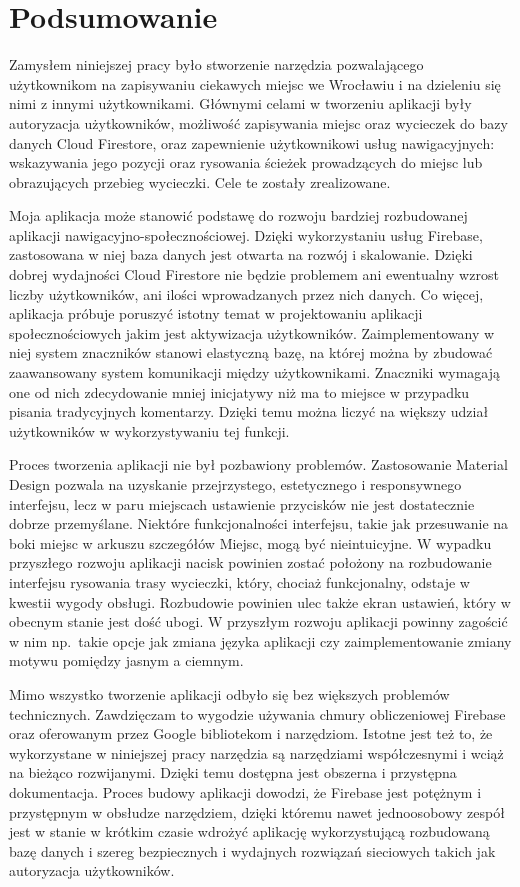 \newpage
    \section{Podsumowanie}
    Zamysłem niniejszej pracy było stworzenie narzędzia pozwalającego użytkownikom na zapisywaniu ciekawych miejsc we Wrocławiu i na dzieleniu się nimi
    z innymi użytkownikami. Głównymi celami w tworzeniu aplikacji były autoryzacja użytkowników, możliwość zapisywania miejsc oraz wycieczek do bazy danych Cloud Firestore,
    oraz zapewnienie użytkownikowi usług nawigacyjnych: wskazywania jego pozycji oraz rysowania ścieżek prowadzących do miejsc lub obrazujących przebieg wycieczki. Cele 
    te zostały zrealizowane. 

    Moja aplikacja może stanowić podstawę do rozwoju bardziej rozbudowanej aplikacji nawigacyjno-społecznościowej. Dzięki wykorzystaniu usług Firebase, zastosowana w niej baza danych jest otwarta na rozwój
    i skalowanie. Dzięki dobrej wydajności Cloud Firestore nie będzie problemem  ani ewentualny wzrost liczby użytkowników, ani ilości wprowadzanych przez nich danych.
    Co więcej, aplikacja próbuje poruszyć istotny temat w projektowaniu aplikacji społecznościowych jakim jest aktywizacja użytkowników. Zaimplementowany w niej system znaczników 
    stanowi elastyczną bazę, na której można by zbudować zaawansowany system komunikacji między użytkownikami. Znaczniki wymagają one od nich zdecydowanie mniej inicjatywy
    niż ma to miejsce w przypadku pisania tradycyjnych komentarzy. Dzięki temu można liczyć na większy udział użytkowników w wykorzystywaniu tej funkcji. 

    Proces tworzenia aplikacji nie był pozbawiony problemów. Zastosowanie Material Design pozwala na uzyskanie przejrzystego, estetycznego i responsywnego interfejsu, lecz w 
    paru miejscach ustawienie przycisków nie jest dostatecznie dobrze przemyślane. Niektóre funkcjonalności interfejsu, takie jak przesuwanie na boki miejsc w arkuszu szczegółów Miejsc,
    mogą być nieintuicyjne. W wypadku przyszłego rozwoju aplikacji nacisk powinien zostać położony na rozbudowanie interfejsu rysowania trasy wycieczki, który, chociaż funkcjonalny,
    odstaje w kwestii wygody obsługi. Rozbudowie powinien ulec także ekran ustawień, który w obecnym stanie jest dość ubogi. W przyszłym rozwoju aplikacji powinny zagościć w nim np.\ takie opcje jak
    zmiana języka aplikacji czy zaimplementowanie zmiany motywu pomiędzy jasnym a ciemnym. 

    Mimo wszystko tworzenie aplikacji odbyło się bez większych problemów technicznych. Zawdzięczam to wygodzie używania chmury obliczeniowej Firebase oraz oferowanym przez Google
    bibliotekom i narzędziom. Istotne jest też to, że wykorzystane w niniejszej pracy narzędzia są narzędziami współczesnymi i wciąż na bieżąco rozwijanymi. Dzięki temu dostępna jest obszerna i przystępna dokumentacja.
    Proces budowy aplikacji dowodzi, że Firebase jest potężnym i przystępnym w obsłudze narzędziem, dzięki któremu nawet jednoosobowy zespół jest w stanie w krótkim czasie wdrożyć aplikację
    wykorzystującą rozbudowaną bazę danych i szereg bezpiecznych i wydajnych rozwiązań sieciowych takich jak autoryzacja użytkowników.